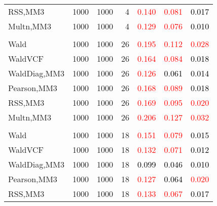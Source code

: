 \documentclass[
]{article}
\begin{document}
\begin{table}[H]
{\begin{tabular}[t]{lrrrrrr}
\hspace{1em}RSS,MM3 & 1000 & 1000 & 4 & \textcolor{red}{0.140} & \textcolor{red}{0.081} & \textcolor{black}{0.017}\\
\hspace{1em}Multn,MM3 & 1000 & 1000 & 4 & \textcolor{red}{0.129} & \textcolor{red}{0.076} & \textcolor{black}{0.010}\\
\addlinespace[0.3em]
\multicolumn{7}{l}{\textbf{1F 15V}}\\
\hspace{1em}Wald & 1000 & 1000 & 26 & \textcolor{red}{0.195} & \textcolor{red}{0.112} & \textcolor{red}{0.028}\\
\hspace{1em}WaldVCF & 1000 & 1000 & 26 & \textcolor{red}{0.164} & \textcolor{red}{0.084} & \textcolor{black}{0.018}\\
\hspace{1em}WaldDiag,MM3 & 1000 & 1000 & 26 & \textcolor{red}{0.126} & \textcolor{black}{0.061} & \textcolor{black}{0.014}\\
\hspace{1em}Pearson,MM3 & 1000 & 1000 & 26 & \textcolor{red}{0.168} & \textcolor{red}{0.089} & \textcolor{black}{0.018}\\
\hspace{1em}RSS,MM3 & 1000 & 1000 & 26 & \textcolor{red}{0.169} & \textcolor{red}{0.095} & \textcolor{red}{0.020}\\
\hspace{1em}Multn,MM3 & 1000 & 1000 & 26 & \textcolor{red}{0.206} & \textcolor{red}{0.127} & \textcolor{red}{0.032}\\
\addlinespace[0.3em]
\multicolumn{7}{l}{\textbf{2F 10V}}\\
\hspace{1em}Wald & 1000 & 1000 & 18 & \textcolor{red}{0.151} & \textcolor{red}{0.079} & \textcolor{black}{0.015}\\
\hspace{1em}WaldVCF & 1000 & 1000 & 18 & \textcolor{red}{0.132} & \textcolor{red}{0.071} & \textcolor{black}{0.012}\\
\hspace{1em}WaldDiag,MM3 & 1000 & 1000 & 18 & \textcolor{black}{0.099} & \textcolor{black}{0.046} & \textcolor{black}{0.010}\\
\hspace{1em}Pearson,MM3 & 1000 & 1000 & 18 & \textcolor{red}{0.127} & \textcolor{black}{0.064} & \textcolor{red}{0.020}\\
\hspace{1em}RSS,MM3 & 1000 & 1000 & 18 & \textcolor{red}{0.133} & \textcolor{red}{0.067} & \textcolor{black}{0.017}\\

\end{tabular}}
\end{table}
\end{document}
